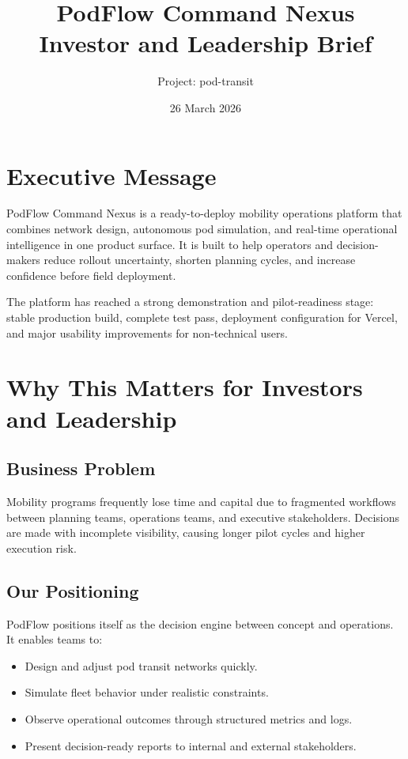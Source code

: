 \documentclass[11pt,a4paper]{article}
\title{PodFlow Command Nexus\\Investor and Leadership Brief}
\author{Project: pod-transit}
\date{26 March 2026}
\begin{document}
\maketitle
\thispagestyle{empty}

\section*{Executive Message}
PodFlow Command Nexus is a ready-to-deploy mobility operations platform that combines network design, autonomous pod simulation, and real-time operational intelligence in one product surface. It is built to help operators and decision-makers reduce rollout uncertainty, shorten planning cycles, and increase confidence before field deployment.

The platform has reached a strong demonstration and pilot-readiness stage: stable production build, complete test pass, deployment configuration for Vercel, and major usability improvements for non-technical users.

\section{Why This Matters for Investors and Leadership}
\subsection*{Business Problem}
Mobility programs frequently lose time and capital due to fragmented workflows between planning teams, operations teams, and executive stakeholders. Decisions are made with incomplete visibility, causing longer pilot cycles and higher execution risk.

\subsection*{Our Positioning}
PodFlow positions itself as the decision engine between concept and operations. It enables teams to:
\begin{itemize}
  \item Design and adjust pod transit networks quickly.
  \item Simulate fleet behavior under realistic constraints.
  \item Observe operational outcomes through structured metrics and logs.
  \item Present decision-ready reports to internal and external stakeholders.
\end{itemize}
\end{document}
